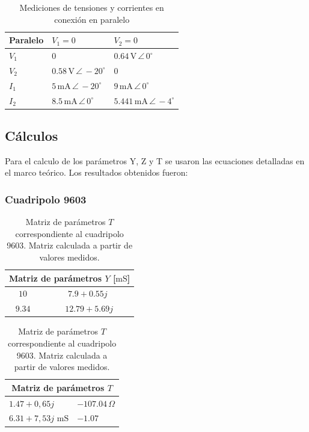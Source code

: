 \begin{table}[H]
\centering
\begin{tabular}{|l|l|l|}
\hline
\textbf{Paralelo} & $V_1 = 0$ & $V_2 = 0$ \\ \hline
$V_1$ & $0$ & $0.64\,\mathrm{V}\,\angle\,0^\circ$ \\ \hline
$V_2$ & $0.58\,\mathrm{V}\,\angle\,-20^\circ$ & $0$ \\ \hline
$I_1$ & $5\,\mathrm{mA}\,\angle\,-20^\circ$ & $9\,\mathrm{mA}\,\angle\,0^\circ$ \\ \hline
$I_2$ & $8.5\,\mathrm{mA}\,\angle\,0^\circ$ & $5.441\,\mathrm{mA}\,\angle\,-4^\circ$ \\ \hline
\end{tabular}
\caption{Mediciones de tensiones y corrientes en conexión en paralelo}
\label{tab:corrientes_tensiones_paralelo}
\end{table}


     
    \subsection{Cálculos}

	Para el calculo de los parámetros Y, Z y T se usaron las ecuaciones detalladas en el marco teórico. Los resultados obtenidos fueron:
	
	\subsubsection*{Cuadripolo 9603}
	
	\begin{table}[H]
\centering
\begin{minipage}{0.48\textwidth}
\centering
\begin{tabular}{|c|c|}
\hline
\multicolumn{2}{|c|}{\textbf{Matriz de parámetros $Y$ [$\mathrm{mS}$]}} \\ \hline
$10      \,$ & $7.9 + 0.55j\,$ \\ \hline
$9.34      \,$ & $  $  $12.79 + 5.69j\,$ \\ \hline
\end{tabular}
\caption{Matriz de parámetros $Y$ correspondiente al cuadripolo 9603. Matriz calculada a partir de valores medidos.}
\label{tab:matriz_Y9603}
\end{minipage}
\hfill
\begin{minipage}{0.48\textwidth}
\centering
\begin{tabular}{|l|l|}
\hline
\multicolumn{2}{|c|}{\textbf{Matriz de parámetros $T$}} \\ \hline
$1.47 + 0,65j$ & $-107.04\,\Omega$ \\ \hline
$6.31 + 7,53j$ $ \mathrm{mS} $ & $-1.07$ \\ \hline
\end{tabular}
\caption{Matriz de parámetros $T$ correspondiente al cuadripolo 9603. Matriz calculada a partir de valores medidos.}
\label{tab:matriz_T9603}
\end{minipage}
\end{table}

